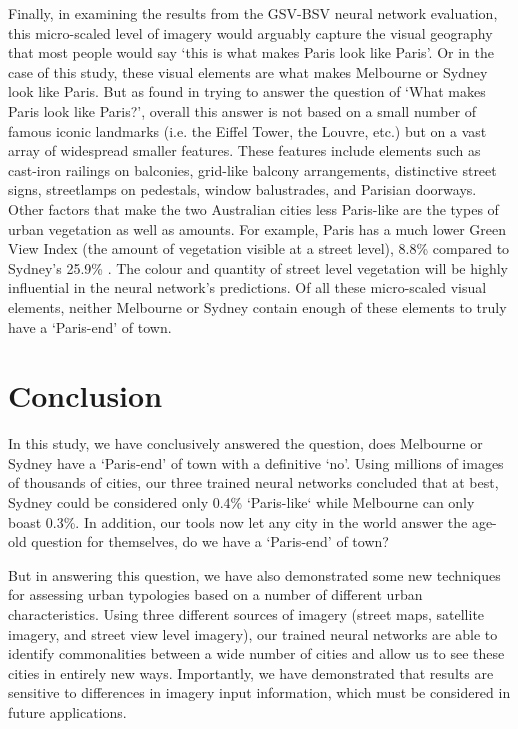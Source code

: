 \documentclass[10pt,letterpaper]{article}
\begin{document}
Finally, in examining the results from the GSV-BSV neural network evaluation, this micro-scaled level of imagery would arguably capture the visual geography that most people would say `this is what makes Paris look like Paris'. Or in the case of this study, these visual elements are what makes Melbourne or Sydney look like Paris. But as \cite{Doersch2012} found in trying to answer the question of `What makes Paris look like Paris?', overall this answer is not based on a small number of famous iconic landmarks (i.e. the Eiffel Tower, the Louvre, etc.) but on a vast array of widespread smaller features. These features include elements such as cast-iron railings on balconies, grid-like balcony arrangements, distinctive street signs, streetlamps on pedestals, window balustrades, and Parisian doorways. Other factors that make the two Australian cities less Paris-like are the types of urban vegetation as well as amounts. For example, Paris has a much lower Green View Index (the amount of vegetation visible at a street level), 8.8\% compared to Sydney's 25.9\% \cite{Li2015}. The colour and quantity of street level vegetation will be highly influential in the neural network's predictions. Of all these micro-scaled visual elements, neither Melbourne or Sydney contain enough of these elements to truly have a `Paris-end' of town.



\section*{Conclusion}\label{sec:conclusion}

In this study, we have conclusively answered the question, does Melbourne or Sydney have a `Paris-end' of town with a definitive `no'. Using millions of images of thousands of cities, our three trained neural networks concluded that at best, Sydney could be considered only 0.4\% `Paris-like` while Melbourne can only boast 0.3\%. In addition, our tools now let any city in the world answer the age-old question for themselves, do we have a `Paris-end' of town?

But in answering this question, we have also demonstrated some new techniques for assessing urban typologies based on a number of different urban characteristics. Using three different sources of imagery (street maps, satellite imagery, and street view level imagery), our trained neural networks are able to identify commonalities between a wide number of cities and allow us to see these cities in entirely new ways. Importantly, we have demonstrated that results are sensitive to differences in imagery input information, which must be considered in future applications. 
\end{document}
